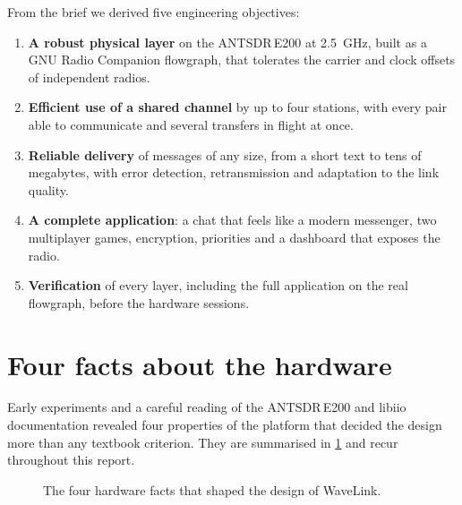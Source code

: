 \documentclass[11pt,a4paper,oneside]{report}
\begin{document}
From the brief we derived five engineering objectives:
\begin{enumerate}[label=\textbf{O\arabic*.},leftmargin=*]
  \item \textbf{A robust physical layer} on the ANTSDR\,E200 at \SI{2.5}{GHz}, built as a GNU Radio
        Companion flowgraph, that tolerates the carrier and clock offsets of independent radios.
  \item \textbf{Efficient use of a shared channel} by up to four stations, with every pair able to
        communicate and several transfers in flight at once.
  \item \textbf{Reliable delivery} of messages of any size, from a short text to tens of megabytes,
        with error detection, retransmission and adaptation to the link quality.
  \item \textbf{A complete application}: a chat that feels like a modern messenger, two multiplayer
        games, encryption, priorities and a dashboard that exposes the radio.
  \item \textbf{Verification} of every layer, including the full application on the real flowgraph,
        before the hardware sessions.
\end{enumerate}

\section{Four facts about the hardware}\label{sec:facts}
Early experiments and a careful reading of the ANTSDR\,E200 and libiio documentation revealed four
properties of the platform that decided the design more than any textbook criterion. They are
summarised in \cref{fig:facts} and recur throughout this report.

\begin{figure}[htbp]
\centering
{}
\caption{The four hardware facts that shaped the design of WaveLink.}\label{fig:facts}
\end{figure}
\end{document}
